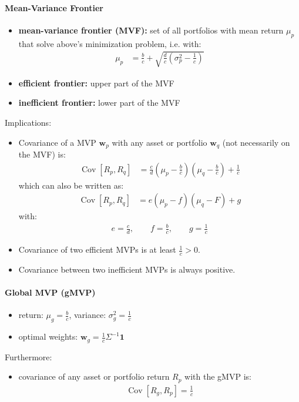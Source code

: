 \documentclass[a4paper,landscape,8pt,fleqn]{scrartcl}
\renewcommand{\emph}[1]{\textbf{#1}}
\DeclareMathOperator{\Cov}{Cov}				%
\begin{document}
\begin{multicols*}{3}
\paragraph{Mean-Variance Frontier}
\begin{itemize}
\item \emph{mean-variance frontier (MVF):} set of all portfolios with mean return $\mu_p$ that solve above's minimization problem, i.e. with:
\begin{align*}
\mu_p &= \frac{b}{c} + \sqrt{\frac{d}{c} \left( \sigma_p^2 - \frac{1}{c} \right)}
\end{align*}
\item \emph{efficient frontier:} upper part of the MVF
\item \emph{inefficient frontier:} lower part of the MVF
\end{itemize}
Implications:
\begin{itemize}
\item Covariance of a MVP $\bm w_p$ with any asset or portfolio $\bm w_q$ (not necessarily on the MVF) is:
\begin{align*}
\Cov \left[ R_p, R_q \right] &= \frac{c}{d} \left( \mu_p - \frac{b}{c} \right) \left( \mu_q - \frac{b}{c} \right) + \frac{1}{c}
\end{align*}
which can also be written as:
\begin{align*}
\Cov \left[ R_p, R_q \right] &= e \left( \mu_p - f \right) \left( \mu_q - F \right) + g
\end{align*}
with:
\begin{align*}
e = \frac{c}{d}, \qquad f = \frac{b}{c}, \qquad g = \frac{1}{c}
\end{align*}
\item Covariance of two efficient MVPs is at least $\frac{1}{c} > 0$.
\item Covariance between two inefficient MVPs is always positive.
\end{itemize}

\paragraph{Global MVP (gMVP)}
\begin{itemize}
\item return: $\mu_g = \frac{b}{c}$, variance: $\sigma_g^2 = \frac{1}{c}$
\item optimal weights: $\bm w_g = \frac{1}{c} \Sigma^{-1} \bm 1$
\end{itemize}
Furthermore:
\begin{itemize}
\item covariance of any asset or portfolio return $R_p$ with the gMVP is:
\begin{align*}
\Cov \left[ R_g, R_p \right] = \frac{1}{c}
\end{align*}
\end{itemize}


\end{multicols*}
\end{document}
